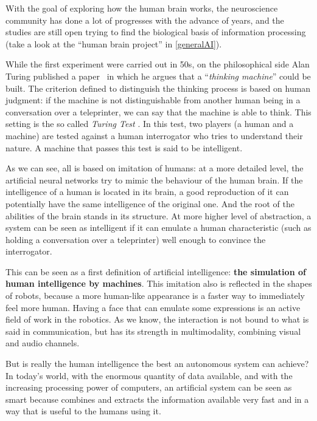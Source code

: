 With the goal of exploring how the human brain works, the neuroscience community has done a lot of progresses with the advance of years, and the studies are still open trying to find the biological basis of information processing (take a look at the ``human brain project''  in \ref{generalAI}).

While the first experiment were carried out in 50s, on the philosophical side Alan Turing published a paper~\cite{turing1950computing} in which he argues that a ``\textit{thinking machine}'' could be built. The criterion defined to distinguish the thinking process is based on human judgment: if the machine is not distinguishable from another human being in a conversation over a teleprinter, we can say that the machine is able to think. This setting is the so called \textit{Turing Test} . In this test, two players (a human and a machine) are tested against a human interrogator who tries to understand their nature. A machine that passes this test is said to be intelligent.

As we can see, all is based on imitation of humans: at a more detailed level, the artificial neural networks try to mimic the behaviour of the human brain. If the intelligence of a human is located in its brain, a good reproduction of it can potentially have the same intelligence of the original one. And the root of the abilities of the brain stands in its structure. At more higher level of abstraction, a system can be seen as intelligent if it can emulate a human characteristic (such as holding a conversation over a teleprinter) well enough to convince the interrogator.

This can be seen as a first definition of artificial intelligence: \textbf{the simulation of human intelligence by machines}. This imitation also is reflected in the shapes of robots, because a more human-like appearance is a faster way to immediately feel more human. Having a face that can emulate some expressions is an active field of work in the robotics. As we know, the interaction is not bound to what is said in communication, but has its strength in multimodality, combining visual and audio channels.

But is really the human intelligence the best an autonomous system can achieve?\\
In today's world, with the enormous quantity of data available, and with the increasing processing power of computers, an artificial system can be seen as smart because combines and extracts the information available very fast and in a way that is useful to the humans using it.


